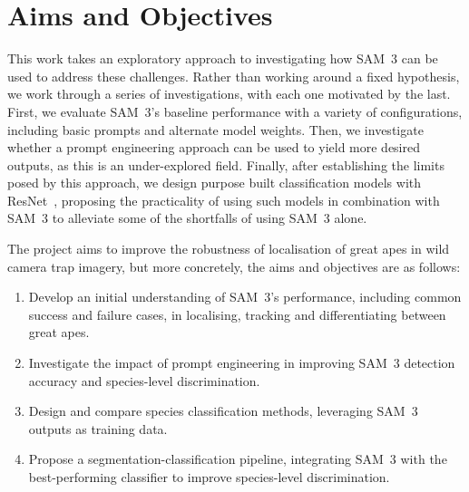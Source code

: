 \documentclass[author={Jacob Stephenson},
    degree={BSc},
    title={Robust Great Ape Species Detection in Wild Camera Trap Imagery with Promptable Concept Segmentation},
    unit={COMS30045},
    subtitle={}]{dissertation}
\begin{document}



\section{Aims and Objectives}
\label{sec:aims}


This work takes an exploratory approach to investigating how SAM~3 can be used to address these challenges. Rather than working around a fixed hypothesis, we work through a series of investigations, with each one motivated by the last. First, we evaluate SAM~3's baseline performance with a variety of configurations, including basic prompts and alternate model weights. Then, we investigate whether a prompt engineering approach can be used to yield more desired outputs, as this is an under-explored field. Finally, after establishing the limits posed by this approach, we design purpose built classification models with ResNet~\cite{he2015deepresiduallearningimage}, proposing the practicality of using such models in combination with SAM~3 to alleviate some of the shortfalls of using SAM~3 alone.

The project aims to improve the robustness of localisation of great apes in wild camera trap imagery, but more concretely, the aims and objectives are as follows:

\begin{enumerate}
    \item Develop an initial understanding of SAM~3's performance, including common success and failure cases, in localising, tracking and differentiating between great apes.
    \item Investigate the impact of prompt engineering in improving SAM~3 detection accuracy and species-level discrimination.
    \item Design and compare species classification methods, leveraging SAM~3 outputs as training data.
    \item Propose a segmentation-classification pipeline, integrating SAM~3 with the best-performing classifier to improve species-level discrimination.
\end{enumerate}
\end{document}
